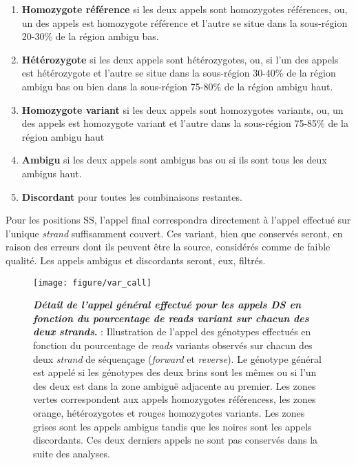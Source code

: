 \documentclass[12pt,twoside]{ugathesis}
\providecommand{\tightlist}{%
  \setlength{\itemsep}{0pt}\setlength{\parskip}{0pt}}
\begin{document}
\begin{enumerate}
\def\labelenumi{\arabic{enumi}.}
\tightlist
\item
  \textbf{Homozygote référence} si les deux appels sont homozygotes
  références, ou, un des appels est homozygote référence et l'autre se
  situe dans la sous-région 20-30\% de la région ambigu bas.\\
\item
  \textbf{Hétérozygote} si les deux appels sont hétérozygotes, ou, si
  l'un des appels est hétérozygote et l'autre se situe dans la
  sous-région 30-40\% de la région ambigu bas ou bien dans la
  sous-région 75-80\% de la région ambigu haut.\\
\item
  \textbf{Homozygote variant} si les deux appels sont homozygotes
  variants, ou, un des appels est homozygote variant et l'autre dans la
  sous-région 75-85\% de la région ambigu haut
\item
  \textbf{Ambigu} si les deux appels sont ambigus bas ou si ils sont
  tous les deux ambigus haut.\\
\item
  \textbf{Discordant} pour toutes les combinaisons restantes.
\end{enumerate}

Pour les positions SS, l'appel final correspondra directement à l'appel
effectué sur l'unique \emph{strand} suffisamment couvert. Ces variant,
bien que conservés seront, en raison des erreurs dont ils peuvent être
la source, considérés comme de faible qualité. Les appels ambigus et
discordants seront, eux, filtrés.

\newpage

\begin{figure}

{\centering \texttt{[image: figure/var\_call]} 

}

\caption[Détail de l'appel général effectué pour les appels DS en fonction du pourcentage de *reads* variant sur chacun des deux *strands*]{\textbf{\emph{Détail de l'appel général effectué pour
les appels DS en fonction du pourcentage de \emph{reads} variant sur
chacun des deux \emph{strands}}.} : Illustration de l'appel des
génotypes effectués en fonction du pourcentage de \emph{reads} variants
observés sur chacun des deux \emph{strand} de séquençage (\emph{forward}
et \emph{reverse}). Le génotype général est appelé si les génotypes des
deux brins sont les mêmes ou si l'un des deux est dans la zone ambiguë
adjacente au premier. Les zones vertes correspondent aux appels
homozygotes référencess, les zones orange, hétérozygotes et rouges
homozygotes variants. Les zones grises sont les appels ambigus tandis
que les noires sont les appels discordants. Ces deux derniers appels ne
sont pas conservés dans la suite des analyses.}\label{fig:picvarcall}
\end{figure}
\end{document}
